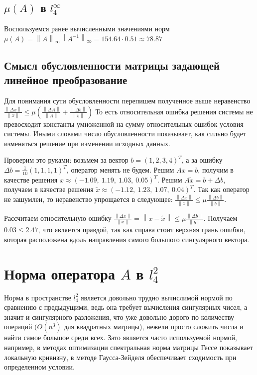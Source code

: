 \documentclass[a4paper]{article}
\newcommand{\norm}[1]{\left \lVert #1 \right \rVert}
\begin{document}
\subsection{\texorpdfstring{$\mu(A)$}{} в \texorpdfstring{$l_{4}^{\infty}$}{}}
Воспользуемся ранее вычисленными значениями норм $\mu(A) = \norm{A}_\infty\norm{A^{-1}}_\infty = 154.64 \cdot 0.51 \approx 78.87$ 

\subsection{Смысл обусловленности матрицы задающей линейное преобразование}
Для понимания сути обусловленности перепишем полученное выше неравенство
$\frac{\norm{\Delta{x}}}{\norm{x}} \le \mu (\frac{\norm{\Delta{A}}}{\norm{A}} + \frac{\norm{\Delta{b}}}{\norm{b}})$
То есть относительная ошибка решения системы не превосходит константы умноженной на сумму относительных ошибок условия системы.
Иными словами число обусловленности показывает, как сильно будет изменяться решение при изменении исходных данных.

Проверим это руками: возьмем за вектор $b = (1, 2, 3, 4)^{T}$, а за ошибку $\Delta{b} = \frac{1}{10}(1,1,1,1)^{T}$, оператор менять не будем.
Решим $Ax = b$, получим в качестве решения $x \approx (-1.09,\ 1.19,\ 1.03,\ 0.05)^{T}$. Решим $A\tilde{x} = b + \Delta{b}$, получаем в качестве решения $\tilde{x} \approx (-1.12,\ 1.23,\ 1.07,\ 0.04)^{T}$.
Так как оператор не зашумлен, то неравенство упрощается в следующее: $\frac{\norm{\Delta{x}}}{\norm{x}} \le \mu \frac{\norm{\Delta{b}}}{\norm{b}}$. 

Рассчитаем относительную ошибку $\frac{\norm{\Delta{x}}}{\norm{x}} = \norm{x - \tilde{x}} \le \mu \frac{\norm{\Delta{b}}}{\norm{b}}$.
Получаем $0.03 \le 2.47$, что является правдой, так как справа стоит верхняя грань ошибки, которая расположена вдоль направления самого большого сингулярного вектора.
\pagebreak

\section{Норма оператора \texorpdfstring{$A$}{} в \texorpdfstring{$l_{4}^{2}$}{}}
Норма в пространстве $l_{4}^{2}$ является довольно трудно вычислимой нормой по сравнению с предыдущими, ведь она требует вычисления сингулярных чисел, а значит и сингулярного разложения, что уже довольно дорого по количеству операций ($O(n^3)$ для квадратных матрицы), нежели просто сложить числа и найти самое большое среди всех.
Зато является часто используемой нормой, например, в методах оптимизации спектральная норма матрицы Гессе показывает локальную кривизну, в методе Гаусса-Зейделя обеспечивает сходимость при определенном условии.
\end{document}
